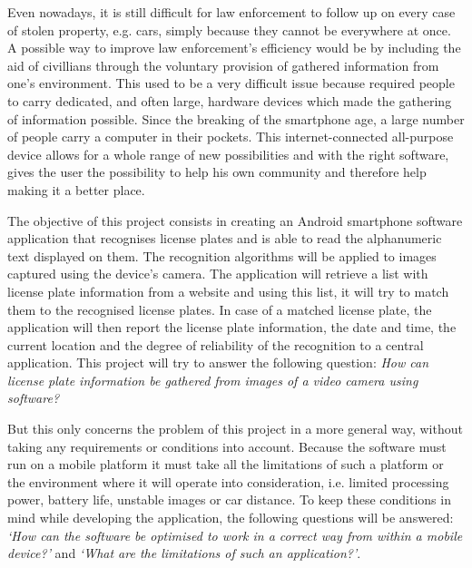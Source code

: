 

Even nowadays, it is still difficult for law enforcement to follow up on every case of stolen property, e.g. cars, simply because they cannot be everywhere at once. A possible way to improve law enforcement's efficiency would be by including the aid of civillians through the voluntary provision of gathered information from one's environment. This used to be a very difficult issue because required people to carry dedicated, and often large, hardware devices which made the gathering of information possible. Since the breaking of the smartphone age, a large number of people carry a computer in their pockets. This internet-connected all-purpose device allows for a whole range of new possibilities and with the right software, gives the user the possibility to help his own community and therefore help making it a better place. 

The objective of this project consists in creating an Android smartphone software application that recognises license plates and is able to read the alphanumeric text displayed on them. The recognition algorithms will be applied to images captured using the device's camera. The application will retrieve a list with license plate information from a website and using this list, it will try to match them to the recognised license plates. In case of a matched license plate, the application will then report the license plate information, the date and time, the current location and the degree of reliability of the recognition to a central application.
This project will try to answer the following question: \textit{How can license plate information be gathered from images of a video camera using software?}

But this only concerns the problem of this project in a more general way, without taking any requirements or conditions into account. Because the software must run on a mobile platform it must take all the limitations of such a platform or the environment where it will operate into consideration, i.e. limited processing power, battery life, unstable images or car distance. To keep these conditions in mind while developing the application, the following questions will be answered: \textit{`How can the software be optimised to work in a correct way from within a mobile device?'} and \textit{`What are the limitations of such an application?'}.

\newpage


